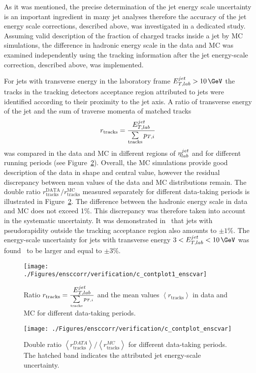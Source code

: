 As it was mentioned, the precise determination of the jet energy scale uncertainty is an important ingredient in many jet analyses therefore the accuracy of the jet energy scale corrections, described above, was investigated in a dedicated study. Assuming valid description of the fraction of charged tracks inside a jet by MC simulations, the difference in hadronic energy scale in the data and MC was examined independently using the tracking information after the jet energy-scale correction, described above, was implemented. 

For jets with transverse energy in the laboratory frame $\etjetlab > 10\,\GeV$ the tracks in the tracking detectors acceptance region attributed to jets were identified according to their proximity to the jet axis. A ratio of transverse energy of the jet and the sum of traverse momenta of matched tracks 
\begin{equation}
r_\text{tracks} = \frac{\mbox{$E_{T,lab}^{jet}$}}{\sum\limits_{\text{tracks}}{p_{T,i}}}
\end{equation}
was compared in the data and MC in different regions of $\mbox{$\eta^{jet}_{lab}$}$ and for different running periods (see Figure~\ref{fig:ratcalibcontrolplotunc1}). Overall, the MC simulations provide good description of the data in shape and central value, however the residual discrepancy between mean values of the data and MC distributions remain. The double ratio $r_\text{tracks}^\text{DATA}/r_\text{tracks}^\text{MC}$ measured separately for different data-taking periods is illustrated in Figure~\ref{fig:ratcalibcontrolplotunc1}. The difference between the hadronic energy scale in data and MC does not exceed 1\%. This discrepancy was therefore taken into account in the systematic uncertainty. It was demonstrated in~\cite{joerg, php jets presentation unpublished} that jets with pseudorapidity outside the tracking acceptance region also amounts to $\pm 1\%$. The energy-scale uncertainty for jets with transverse energy $3<\etjetlab<10\,\GeV$ was found~\cite{joerg} to be larger and equal to $\pm 3\%$.
\begin{figure}[h!]
	\centering
		\texttt{[image: ./Figures/ensccorr/verification/c\_contplot1\_enscvar]} 
	\caption{Ratio $r_\text{tracks} = \frac{\mbox{$E_{T,lab}^{jet}$}}{\sum\limits_{\text{tracks}}{p_{T,i}}}$ and the mean values $\left\langle r_\text{tracks}\right\rangle$ in data and MC for different data-taking periods.}
	\label{fig:ratcalibcontrolplotunc}
\end{figure}

\begin{figure}[ht]
	\centering
		\texttt{[image: ./Figures/ensccorr/verification/c\_contplot\_enscvar]} 
	\caption{Double ratio $\left\langle r^{DATA}_\text{tracks}\right\rangle/\left\langle r^{MC}_\text{tracks}\right\rangle$ for different data-taking periods. The hatched band indicates the attributed jet energy-scale uncertainty.}
	\label{fig:ratcalibcontrolplotunc1}
\end{figure}
